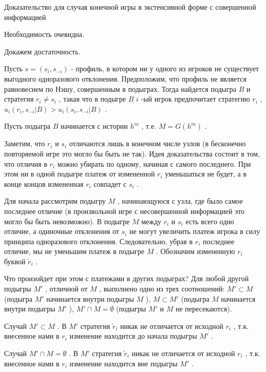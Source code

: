 \documentclass[pdftex,12pt,a4paper]{article}
\begin{document}
Доказательство для случая конечной игры в экстенсивной форме с совершенной информацией

Необходимость очевидна.

Докажем достаточность.

Пусть  $s=\left(s_{i} ,s_{-i} \right)$  - профиль, в котором ни у одного из игроков не существует выгодного одноразового отклонения. Предположим, что профиль не является равновесием по Нэшу, совершенным в подыграх. Тогда найдется подыгра  $B$  и стратегия  $r_{i} \ne s_{i} $ , такая что в подыгре  $B$   $i$ -ый игрок предпочитает стратегию  $r_{i} $ ,  $u_{i} \left(r_{i} ,s_{-i} |B\right)>u_{i} \left(s_{i} ,s_{-i} |B\right)$ .

Пусть подыгра  $B$  начинается с истории  $h^{m} $ , т.е.  $M=G\left(h^{m} \right)$ .

Заметим, что  $r_{i} $  и  $s_{i} $  отличаются лишь в конечном числе узлов (в бесконечно повторяемой игре это могло бы быть не так). Идея доказательства состоит в том, что отличия в  $r_{i} $  можно убирать по одному, начиная с самого последнего. При этом ни в одной подыгре платеж от измененной  $r_{i} $  уменьшаться не будет, а в конце концов измененная  $r_{i} $  совпадет с  $s_{i} $ .

Для начала рассмотрим подыгру  $M$ , начинающуюся с узла, где было самое последнее отличие (в произвольной игре с несовершенной информацией это могло бы быть невозможно). В подыгре  $M$  между  $r_{i} $  и  $s_{i} $  есть всего одно отличие, а одиночные отклонения от  $s_{i} $  не могут увеличить платеж игрока в силу принципа одноразового отклонения. Следовательно, убрав в  $r_{i} $  последнее отличие, мы не уменьшим платеж в подыгре  $M$ . Обозначим измененную  $r_{i} $  буквой  $\tilde{r}_{i} $ .

Что произойдет при этом с платежами в других подыграх? Для любой другой подыгры  $M'$ , отличной от  $M$ , выполнено одно из трех соотношений:  $M'\subset M$  (подыгра  $M'$  начинается внутри подыгры  $M$ ),  $M\subset M'$  (подыгра  $M$  начинается внутри подыгры  $M'$ ),  $M'\cap M=\emptyset $  (подыгры  $M'$  и  $M$  не пересекаются).

Случай  $M'\subset M$ . В  $M'$  стратегия  $\tilde{r}_{i} $  никак не отличается от исходной  $r_{i} $ , т.к. внесенное нами в  $r_{i} $  изменение находится до начала подыгры  $M'$ .

Случай  $M'\cap M=\emptyset $ . В  $M'$  стратегия  $\tilde{r}_{i} $  никак не отличается от исходной  $r_{i} $ , т.к. внесенное нами в  $r_{i} $  изменение находится вне подыгры  $M'$ .
\end{document}

